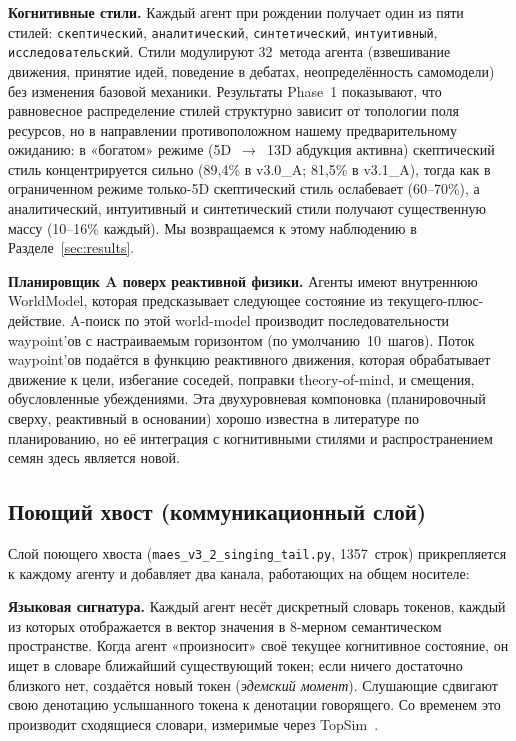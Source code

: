 \documentclass[11pt,a4paper]{article}
\begin{document}
\textbf{Когнитивные стили.} Каждый агент при рождении получает один из
пяти стилей: \texttt{скептический}, \texttt{аналитический},
\texttt{синтетический}, \texttt{интуитивный},
\texttt{исследовательский}. Стили модулируют 32~метода агента (взвешивание
движения, принятие идей, поведение в дебатах, неопределённость
самомодели) без изменения базовой механики. Результаты Phase~1
показывают, что равновесное распределение стилей структурно зависит от
топологии поля ресурсов, но в направлении противоположном нашему
предварительному ожиданию: в «богатом» режиме (5D~$\rightarrow$~13D
абдукция активна) скептический стиль концентрируется сильно (89{,}4\%
в v3.0\_A; 81{,}5\% в v3.1\_A), тогда как в ограниченном режиме
только-5D скептический стиль ослабевает (60--70\%), а аналитический,
интуитивный и синтетический стили получают существенную массу
(10--16\% каждый). Мы возвращаемся к этому наблюдению в
Разделе~\ref{sec:results}.

\textbf{Планировщик A\* поверх реактивной физики.} Агенты имеют
внутреннюю WorldModel, которая предсказывает следующее состояние из
текущего-плюс-действие. A\*-поиск по этой world-model производит
последовательности waypoint'ов с настраиваемым горизонтом (по
умолчанию~10~шагов). Поток waypoint'ов подаётся в функцию реактивного
движения, которая обрабатывает движение к цели, избегание соседей,
поправки theory-of-mind, и смещения, обусловленные убеждениями. Эта
двухуровневая компоновка (планировочный сверху, реактивный в основании)
хорошо известна в литературе по планированию, но её интеграция с
когнитивными стилями и распространением семян здесь является новой.

\subsection{Поющий хвост (коммуникационный слой)}

Слой поющего хвоста (\texttt{maes\_v3\_2\_singing\_tail.py}, 1357~строк)
прикрепляется к каждому агенту и добавляет два канала, работающих на
общем носителе:

\textbf{Языковая сигнатура.} Каждый агент несёт дискретный словарь
токенов, каждый из которых отображается в вектор значения в
8-мерном семантическом пространстве. Когда агент «произносит» своё
текущее когнитивное состояние, он ищет в словаре ближайший существующий
токен; если ничего достаточно близкого нет, создаётся новый токен
(\emph{эдемский момент}). Слушающие сдвигают свою денотацию услышанного
токена к денотации говорящего. Со временем это производит сходящиеся
словари, измеримые через TopSim~\cite{brighton2006topsim}.
\end{document}
